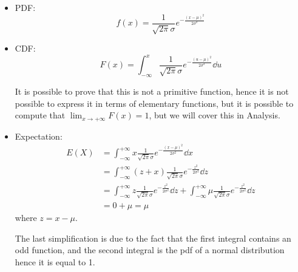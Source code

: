 \documentclass[12pt]{extarticle}
\begin{document}
\begin{itemize}
    \item PDF:
          \begin{equation}
              f(x) = \frac{1}{\sqrt{2\pi} \sigma} e^{-\frac{(x-\mu)^2}{2\sigma^2}}
          \end{equation}
    \item CDF:
          \begin{equation}
              F(x) = \int_{-\infty}^x \frac{1}{\sqrt{2\pi} \sigma} e^{-\frac{(u-\mu)^2}{2\sigma^2}} \dd{u}
          \end{equation}

          It is possible to prove that this is not a primitive function, hence it is not possible to express it in terms of elementary functions, but it is possible to compute that $\lim_{x \to +\infty} F(x) = 1$, but we will cover this in Analysis.
    \item Expectation:
          \begin{align}
              E(X) & = \int_{-\infty}^{+\infty} x \frac{1}{\sqrt{2\pi} \sigma} e^{-\frac{(x-\mu)^2}{2\sigma^2}} \dd{x}                                                                                         \\
                   & = \int_{-\infty}^{+\infty} (z + x) \frac{1}{\sqrt{2\pi} \sigma} e^{-\frac{z^2}{2\sigma^2}} \dd{z}                                                                                         \\
                   & = \int_{-\infty}^{+\infty} z \frac{1}{\sqrt{2\pi} \sigma} e^{-\frac{z^2}{2\sigma^2}} \dd{z} + \int_{-\infty}^{+\infty} \mu \frac{1}{\sqrt{2\pi} \sigma} e^{-\frac{z^2}{2\sigma^2}} \dd{z} \\
                   & = 0 + \mu = \mu
          \end{align}
          where $z = x - \mu$.

          The last simplification is due to the fact that the first integral contains an odd function, and the second integral is the pdf of a normal distribution hence it is equal to 1.


\end{itemize}
\end{document}
